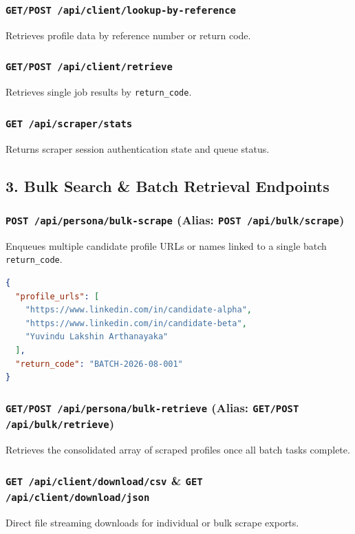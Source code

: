 \documentclass[11pt,a4paper]{report}
\begin{document}
\subsubsection{\texttt{GET/POST /api/client/lookup-by-reference}}
Retrieves profile data by reference number or return code.

\subsubsection{\texttt{GET/POST /api/client/retrieve}}
Retrieves single job results by \texttt{return\_code}.

\subsubsection{\texttt{GET /api/scraper/stats}}
Returns scraper session authentication state and queue status.

\subsection{3. Bulk Search \& Batch Retrieval Endpoints}

\subsubsection{\texttt{POST /api/persona/bulk-scrape} (Alias: \texttt{POST /api/bulk/scrape})}
Enqueues multiple candidate profile URLs or names linked to a single batch \texttt{return\_code}.
\begin{lstlisting}[language=json]
{
  "profile_urls": [
    "https://www.linkedin.com/in/candidate-alpha",
    "https://www.linkedin.com/in/candidate-beta",
    "Yuvindu Lakshin Arthanayaka"
  ],
  "return_code": "BATCH-2026-08-001"
}
\end{lstlisting}

\subsubsection{\texttt{GET/POST /api/persona/bulk-retrieve} (Alias: \texttt{GET/POST /api/bulk/retrieve})}
Retrieves the consolidated array of scraped profiles once all batch tasks complete.

\subsubsection{\texttt{GET /api/client/download/csv} \& \texttt{GET /api/client/download/json}}
Direct file streaming downloads for individual or bulk scrape exports.
\end{document}
